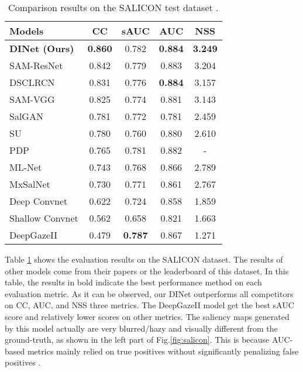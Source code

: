\begin{table}[]
	\scriptsize
	\centering
	\caption{Comparison results on the SALICON test dataset \cite{jiang2015salicon}.}

\label{salicontest}
	\begin{tabular}{|l|c c c c|}
		\hline
		Models & CC & sAUC & AUC & NSS \\ \hline  
		\textbf{DINet (Ours)} & \textbf{0.860} & 0.782 & \textbf{0.884} & \textbf{3.249} \\ \hline
		SAM-ResNet \cite{cornia2016predicting} & 0.842 & 0.779 & 0.883 & 3.204\\ \hline
		DSCLRCN \cite{liu2016deep} & 0.831 & 0.776 & \textbf{0.884} & 3.157 \\ \hline
		SAM-VGG \cite{cornia2016predicting} & 0.825 & 0.774 & 0.881 & 3.143 \\ \hline
		SalGAN \cite{pan2017salgan} & 0.781 & 0.772 & 0.781 & 2.459 \\ \hline
		SU \cite{kruthiventi2016saliency} & 0.780 & 0.760 & 0.880 & 2.610 \\ \hline
		PDP \cite{jetley2016end}& 0.765 & 0.781 & 0.882 & - \\ \hline
		ML-Net \cite{cornia2016deep} & 0.743 & 0.768 & 0.866 & 2.789 \\ \hline
		MxSalNet \cite{dodge2017visual} & 0.730 & 0.771 & 0.861 & 2.767 \\ \hline
		Deep Convnet \cite{pan2016shallow} & 0.622 & 0.724 & 0.858 & 1.859 \\ \hline
		Shallow Convnet \cite{pan2016shallow} & 0.562 & 0.658 & 0.821 & 1.663 \\ \hline
		DeepGazeII \cite{kummerer2016deepgaze} & 0.479 & \textbf{0.787} & 0.867 & 1.271 \\ \hline		
	\end{tabular}
	\vspace{-4mm}
\end{table}


Table \ref{salicontest} shows the evaluation results on the SALICON dataset. The results of other models come from their papers or the leaderboard of this dataset. In this table, the results in bold indicate the best performance method on each evaluation metric. As it can be observed, our DINet outperforms all competitors on CC, AUC, and NSS three metrics. The DeepGazeII \cite{kummerer2016deepgaze} model get the best sAUC score and relatively lower scores on other metrics. The saliency maps generated by this model actually are very blurred/hazy and visually different from the ground-truth, as shown in the left part of Fig.\ref{fig:salicon}. This is because AUC-based metrics mainly relied on true positives without significantly penalizing false positives \cite{kruthiventi2017deepfix,cornia2016predicting}. 







